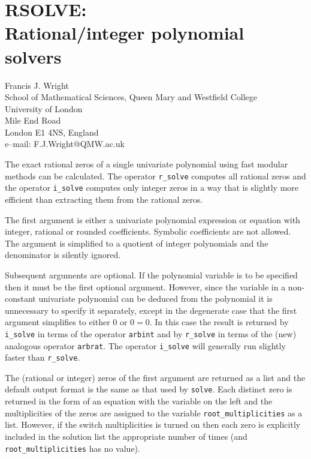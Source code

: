 \chapter[RSOLVE: Rational polynomial solver]%
        {RSOLVE: \protect\\ Rational/integer polynomial solvers}
\label{RSOLVE}

{\footnotesize
\begin{center}
Francis J. Wright \\
School of Mathematical Sciences, Queen Mary and Westfield College \\
University of London \\
Mile End Road \\
London E1 4NS, England \\[0.05in]
e--mail:  F.J.Wright@QMW.ac.uk
\end{center}
}

The exact rational zeros of a single univariate polynomial using fast
modular methods can be calculated.
The operator \verb|r_solve| computes
all rational zeros and the operator \verb|i_solve|
 computes only
integer zeros in a way that is slightly more efficient than extracting
them from the rational zeros.

The first argument is either a univariate polynomial expression or
equation with integer, rational or rounded coefficients.  Symbolic
coefficients are not allowed.  The argument is simplified to a
quotient of integer polynomials and the denominator is silently
ignored.

Subsequent arguments are optional.  If the polynomial variable is to
be specified then it must be the first optional argument.  However,
since the variable in a non-constant univariate polynomial can be
deduced from the polynomial it is unnecessary to specify it
separately, except in the degenerate case that the first argument
simplifies to either 0 or $0 = 0$.  In this case the result is
returned by \verb|i_solve| in terms of the operator \verb|arbint| and
by \verb|r_solve| in terms of the (new) analogous operator
\verb|arbrat|.  The operator \verb|i_solve| will generally run
slightly faster than \verb|r_solve|.

The (rational or integer) zeros of the first argument are returned as
a list and the default output format is the same as that used by
\verb|solve|.  Each distinct zero is returned in the form of an
equation with the variable on the left and the multiplicities of the
zeros are assigned to the variable \verb|root_multiplicities| as a
list.  However, if the switch {\ttfamily multiplicities} is turned on then
each zero is explicitly included in the solution list the appropriate
number of times (and \verb|root_multiplicities| has no value).


